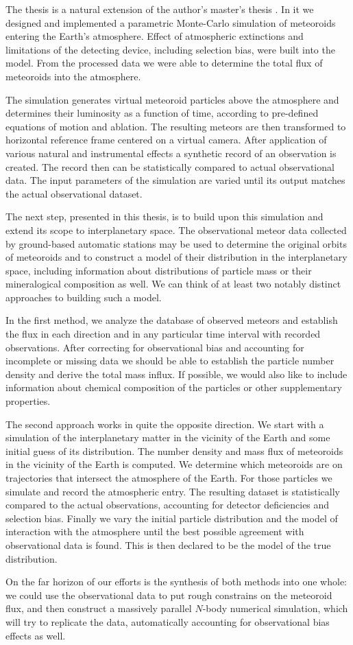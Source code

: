 The thesis is a natural extension of the author's master's thesis \citep{balaz-thesis}.
In it we designed and implemented a parametric Monte-Carlo simulation of meteoroids entering the Earth's atmosphere.
Effect of atmospheric extinctions and limitations of the detecting device, including selection bias, were built into the model.
From the processed data we were able to determine the total flux of meteoroids into the atmosphere.

The simulation generates virtual meteoroid particles above the atmosphere and determines their
luminosity as a function of time, according to pre-defined equations of motion and ablation.
The resulting meteors are then transformed to horizontal reference frame centered on a virtual camera.
After application of various natural and instrumental effects a synthetic record of an observation is created.
The record then can be statistically compared to actual observational data.
The input parameters of the simulation are varied until its output matches the actual observational dataset.

The next step, presented in this thesis, is to build upon this simulation and extend its scope to interplanetary space.
The observational meteor data collected by ground-based automatic stations may be used
to determine the original orbits of meteoroids and to construct a model
of their distribution in the interplanetary space, including information
about distributions of particle mass or their mineralogical composition as well.
We can think of at least two notably distinct approaches to building such a model.

In the first method, we analyze the database of observed meteors and establish
the flux in each direction and in any particular time interval with recorded observations.
After correcting for observational bias and accounting for incomplete or missing
data we should be able to establish the particle number density and derive the total mass influx.
If possible, we would also like to include information
about chemical composition of the particles or other supplementary properties.

The second approach works in quite the opposite direction. We start with a simulation
of the interplanetary matter in the vicinity of the Earth and some initial guess of its distribution.
The number density and mass flux of meteoroids in the vicinity of the Earth is computed.
We determine which meteoroids are on trajectories that intersect the atmosphere of the Earth.
For those particles we simulate and record the atmospheric entry. The resulting dataset is statistically compared
to the actual observations, accounting for detector deficiencies and selection bias.
Finally we vary the initial particle distribution and the model of interaction with the atmosphere
until the best possible agreement with observational data is found.
This is then declared to be the model of the true distribution.

On the far horizon of our efforts is the synthesis of both methods into one whole:
we could use the observational data to put rough constrains on the meteoroid flux,
and then construct a massively parallel $N$-body numerical simulation,
which will try to replicate the data, automatically accounting for observational bias effects as well.
